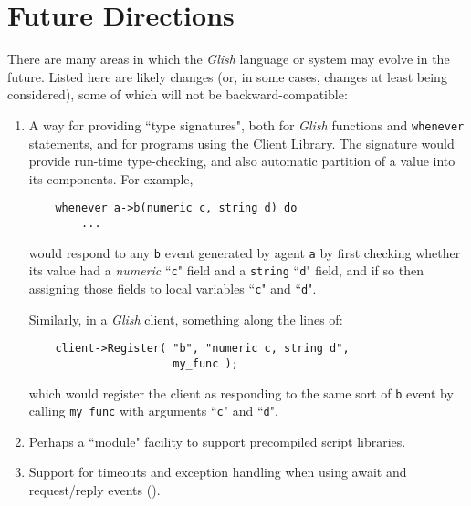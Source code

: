 
\chapter{Future Directions}
\label{future}

There are many areas in which the {\em Glish} language or system may
evolve in the future.  Listed here are likely changes (or, in some
cases, changes at least being considered), some of which will not be
backward-compatible:

\begin{enumerate}

\item A way for providing ``type signatures", both for {\em Glish} functions
and {\tt whenever} statements, and for programs using the Client Library.
The signature would provide run-time type-checking, and also automatic
partition of a value into its components.  For example,
\begin{verbatim}
    whenever a->b(numeric c, string d) do
        ...
\end{verbatim}
would respond to any {\tt b} event generated by agent {\tt a} by
first checking whether its value had a {\em numeric} ``{\tt c}" field and
a {\tt string} ``{\tt d}" field, and if so then assigning those
fields to local variables ``{\tt c}" and ``{\tt d}".

Similarly, in a {\em Glish} client, something along the lines of:
\begin{verbatim}
    client->Register( "b", "numeric c, string d",
                      my_func );
\end{verbatim}
which would register the client as responding to the same sort
of {\tt b} event by calling {\tt my\_func} with arguments ``{\tt c}"
and ``{\tt d}".

\item Perhaps a ``module" facility to support precompiled script
libraries.

\item Support for
timeouts and
exception handling when using await and request/reply events ().


\end{enumerate}
